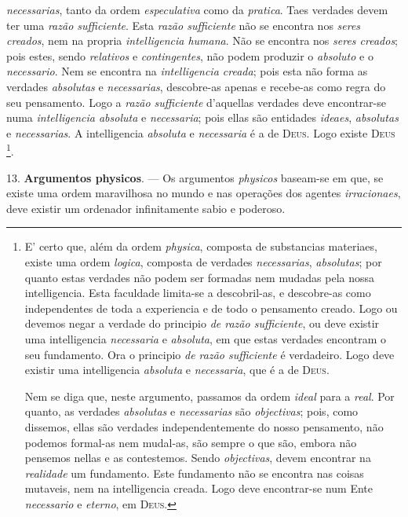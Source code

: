 \emph{necessarias}, tanto da ordem \emph{especulativa} como da \emph{pratica}. Taes verdades devem ter uma \emph{razão sufficiente}. Esta \emph{razão sufficiente} não se encontra nos \emph{seres creados}, nem na propria \emph{intelligencia humana}. Não se encontra nos \emph{seres creados}; pois estes, sendo \emph{relativos} e \emph{contingentes}, não podem produzir o \emph{absoluto} e o \emph{necessario}. Nem se encontra na \emph{intelligencia creada}; pois esta não forma as verdades \emph{absolutas} e \emph{necessarias}, descobre-as apenas e recebe-as como regra do seu pensamento. Logo a \emph{razão sufficiente} d'aquellas verdades deve encontrar-se numa \emph{intelligencia absoluta} e \emph{necessaria}; pois ellas são entidades \emph{ideaes}, \emph{absolutas} e \emph{necessarias}. A intelligencia \emph{absoluta} e \emph{necessaria} é a de \textsc{Deus}. Logo existe \textsc{Deus} \footnote{E' certo que, além da ordem \emph{physica}, composta de substancias materiaes, existe uma ordem \emph{logica}, composta de verdades \emph{necessarias}, \emph{absolutas}; por quanto estas verdades não podem ser formadas nem mudadas pela nossa intelligencia. Esta faculdade limita-se a descobril-as, e descobre-as como independentes de toda a experiencia e de todo o pensamento creado. Logo ou devemos negar a verdade do principio \emph{de razão sufficiente}, ou deve existir uma intelligencia \emph{necessaria} e \emph{absoluta}, em que estas verdades encontram o seu fundamento. Ora o principio \emph{de razão sufficiente} é verdadeiro. Logo deve existir uma intelligencia \emph{absoluta} e \emph{necessaria}, que é a de \textsc{Deus}.\par Nem se diga que, neste argumento, passamos da ordem \emph{ideal} para a \emph{real}. Por quanto, as verdades \emph{absolutas} e \emph{necessarias} são \emph{objectivas}; pois, como dissemos, ellas são verdades independentemente do nosso pensamento, não podemos formal-as nem mudal-as, são sempre o que são, embora não pensemos nellas e as contestemos. Sendo \emph{objectivas}, devem encontrar na \emph{realidade} um fundamento. Este fundamento não se encontra nas coisas mutaveis, nem na intelligencia creada. Logo deve encontrar-se num Ente \emph{necessario} e \emph{eterno}, em \textsc{Deus}.}.

13. \textbf{Argumentos physicos}. --- Os argumentos \emph{physicos} baseam-se em que, se existe uma ordem maravilhosa no mundo e nas operações dos agentes \emph{irracionaes}, deve existir um ordenador infinitamente sabio e poderoso.

